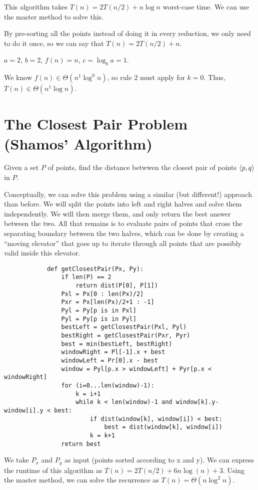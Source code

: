         This algorithm takes $T(n) = 2T(n/2) + n\log n$ worst-case time. We can
        use the master method to solve this.

        By pre-sorting all the points instead of doing it in every reduction, we
        only need to do it once, so we can say that $T(n) = 2T(n/2) + n$.

        $a = 2$, $b = 2$, $f(n) = n$, $c = \log_b{a} = 1$.

        We know $f(n) \in \Theta(n^1 \log^0 n)$, so rule 2 must apply for
        $k = 0$. Thus, $T(n) \in \Theta(n^1 \log n)$.

    \section{The Closest Pair Problem (Shamos' Algorithm)}
        Given a set $P$ of points, find the distance betwwen the closest pair of
        points $\left \langle p, q \right \rangle $ in $P$.

        Conceptually, we can solve this problem using a similar (but different!)
        approach than before. We will split the points into left and right
        halves and solve them independently. We will then merge them, and only
        return the best answer between the two. All that remains is to evaluate
        pairs of points that cross the separating boundary between the two
        halves, which can be done by creating a ``moving elevator'' that goes up
        to iterate through all points that are possibly valid inside this
        elevator.

        \begin{verbatim}
            def getClosestPair(Px, Py):
                if len(P) == 2
                    return dist(P[0], P[1])
                Pxl = Px[0 : len(Px)/2]
                Pxr = Px[len(Px)/2+1 : -1]
                Pyl = Py[p is in Pxl]
                Pyl = Py[p is in Pyl]
                bestLeft = getClosestPair(Pxl, Pyl)
                bestRight = getClosestPair(Pxr, Pyr)
                best = min(bestLeft, bestRight)
                windowRight = Pl[-1].x + best
                windowLeft = Pr[0].x - best
                window = Pyl[p.x > windowLeft] + Pyr[p.x < windowRight]
                for (i=0...len(window)-1):
                    k = i+1
                    while k < len(window)-1 and window[k].y-window[i].y < best:
                        if dist(window[k], window[i]) < best:
                            best = dist(window[k], window[i])
                        k = k+1
                return best
        \end{verbatim}
        We take $P_x$ and $P_y$ as input (points sorted according to x and y).
        We can express the runtime of this algorithm as
        $T(n) = 2T(n/2) + 6n \log(n) + 3$. Using the master method, we can solve
        the recurrence as $T(n) = \Theta(n \log^2 n)$.

